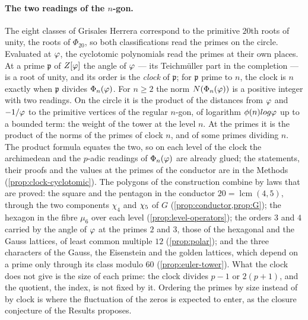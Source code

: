 \paragraph{The two readings of the $n$-gon.}
The eight classes of Grisales Herrera correspond to the
primitive $20$th roots of unity, the roots of
$\Phi_{20}$, so both classifications read the primes on
the circle.  Evaluated at $\varphi$, the cyclotomic
polynomials read the primes at their own places.  At a
prime $\mathfrak p$ of $Z[\varphi]$ the angle of $\varphi$ ---
its Teichm\"uller part in the completion --- is a root of
unity, and its order is the \emph{clock} of
$\mathfrak p$; for $\mathfrak p$ prime to $n$, the clock
is $n$ exactly when $\mathfrak p$ divides
$\Phi_n(\varphi)$.  For $n\ge2$ the norm
$N(\Phi_n(\varphi))$ is a positive integer with two
readings.  On the circle it is the product of the
distances from $\varphi$ and $-1/\varphi$ to the
primitive vertices of the regular $n$-gon, of logarithm
$\phi(n)log\varphi$ up to a bounded term: the weight of
the tower at the level $n$.  At the primes it is the
product of the norms of the primes of clock $n$, and of
some primes dividing $n$.  The product formula equates
the two, so on each level of the clock the archimedean
and the $p$-adic readings of $\Phi_n(\varphi)$ are
already glued; the statements, their proofs and the
values at the primes of the conductor are in the Methods
(\cref{prop:clock-cyclotomic}).  The polygons of the construction combine by laws that are proved: the
square and the pentagon in the conductor $20=\operatorname{lcm}(4,5)$, through the two components $\chi_4$ and
$\chi_5$ of $G$ (\cref{prop:conductor,prop:G}); the hexagon in the fibre $\mu_6$ over each level
(\cref{prop:level-operators}); the orders $3$ and $4$ carried by the angle of $\varphi$ at the primes $2$ and $3$,
those of the hexagonal and the Gauss lattices, of least common multiple $12$ (\cref{prop:polar}); and the three
characters of the Gauss, the Eisenstein and the golden lattices, which depend on a prime only through its class
modulo $60$ (\cref{prop:euler-tower}).  What the clock does not
give is the size of each prime: the clock divides $p-1$
or $2(p+1)$, and the quotient, the index, is not fixed
by it.  Ordering the primes by size instead of by clock
is where the fluctuation of the zeros is expected to
enter, as the closure conjecture of the Results
proposes.

